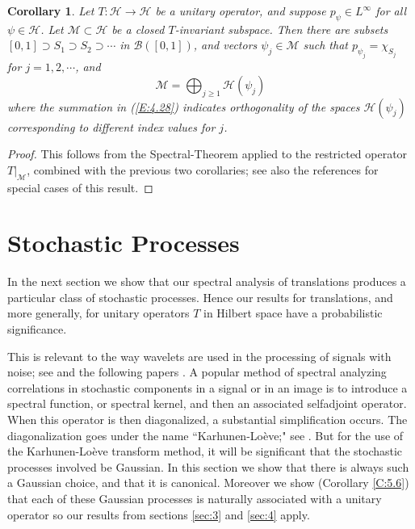 \documentclass{birkmult}
\newtheorem{cor}[thm]{Corollary}
\theoremstyle{definition}
\theoremstyle{remark}
\numberwithin{equation}{section}
\begin{document}
\begin{cor}
\label{C:4.8}
Let $T:\mathcal{H} \to \mathcal{H}$ be a unitary operator, and suppose 
$p_{\psi} \in L^{\infty}$ for all $\psi \in \mathcal{H}$.
Let $\mathcal{M} \subset \mathcal{H}$ be a closed $T$-invariant subspace.  
Then there are subsets $[0,1] \supset S_{1} \supset S_{2} \supset \cdots$ 
in $\mathcal{B}([0,1])$, and vectors $\psi_{j} \in \mathcal{M}$ such that 
$p_{\psi_{j}} = \chi_{S_{j}}$ for $j=1,2, \cdots$, and
\begin{equation}
\label{E:4.28}
  \mathcal{M} = \bigoplus_{j \geq 1} \mathcal{H}(\psi_{j})
\end{equation}
where the summation in (\ref{E:4.28}) indicates orthogonality of the 
spaces $\mathcal{H}(\psi_{j})$ corresponding to different index values 
for $j$.
\end{cor}
\begin{proof}
This follows from the Spectral-Theorem applied to the restricted operator 
$T |_{\mathcal{M}}$, combined with the previous two corollaries; see also 
the references \cite{BMM99, Bag00} for special cases of this result.
\end{proof}

\section{Stochastic Processes}
\label{sec:5}
In the next section we show that our spectral analysis of translations 
produces a particular class of stochastic processes. Hence our results for 
translations, and more generally, for unitary operators $T$ in Hilbert 
space have a probabilistic significance. 

This is relevant to the way wavelets are used in the processing of signals 
with noise; see \cite{Jor06, Jor06b} and the following papers 
\cite{JoSo07, Son07}.
A popular method of spectral analyzing correlations in stochastic 
components in a signal or in an image is to introduce a spectral function, 
or spectral kernel, and then an associated selfadjoint operator. When this 
operator is then diagonalized, a substantial simplification occurs. The 
diagonalization goes under the name ``Karhunen-Lo\`{e}ve;"  
see \cite{JoSo07, Son07}. But for the use of the Karhunen-Lo\`{e}ve transform 
method, 
it will be significant that the stochastic processes involved be Gaussian. 
In this section we show that there is always such a Gaussian choice, and 
that it is canonical. Moreover we show (Corollary \ref{C:5.6}) that each of these 
Gaussian processes is naturally associated with a unitary operator so our 
results from sections \ref{sec:3} and \ref{sec:4} apply.
\end{document}
